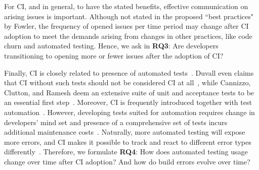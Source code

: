 For CI, and \DO in general, to have the stated benefits, effective communication on arising issues is important.
Although not stated in the proposed ``best practices" by Fowler, the frequency of opened issues per time period may change after CI adoption to meet the demands arising from changes in other practices, like code churn and automated testing.
Hence, we ask in \textbf{RQ3}: 
Are developers transitioning to opening more or fewer issues after the adoption of CI?

Finally, CI is closely related to presence of automated tests~\cite{Fowler}. 
Duvall even claims that CI without such tests should not be considered CI 
at all~\cite{Duvall}, while Cannizzo, Clutton, and Ramesh deem an extensive 
suite of unit and acceptance tests to be an essential first step~\cite{CannizzoCluttonRamesh}. 
Moreover, CI is frequently introduced together with test automation~\cite{Yuksel}.
However, developing tests suited for automation requires change in developers' 
mind set and presence of a comprehensive set of tests incurs additional maintenance 
costs~\cite{CoramBohner}.
Naturally, more automated testing will expose more errors, and CI makes it possible 
to track and react to different error types differently~\cite{BellerGZ16}.
Therefore, we formulate \textbf{RQ4}: 
How does automated testing usage change over time after CI adoption? 
And how do build errors evolve over time? 

